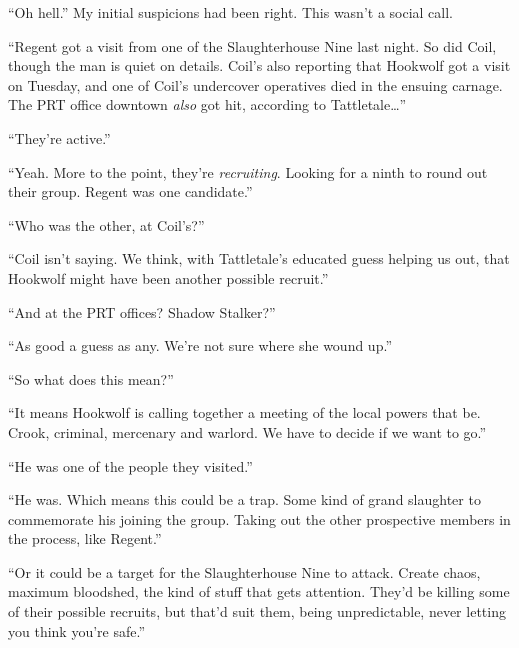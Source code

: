 ``Oh hell.''  My initial suspicions had been right.  This wasn't a social call.



``Regent got a visit from one of the Slaughterhouse Nine last night.  So did Coil, though the man is quiet on details.  Coil's also reporting that Hookwolf got a visit on Tuesday, and one of Coil's undercover operatives died in the ensuing carnage.  The PRT office downtown \emph{also} got hit, according to Tattletale\ldots''



``They're active.''



``Yeah.  More to the point, they're \emph{recruiting}.  Looking for a ninth to round out their group.  Regent was one candidate.''



``Who was the other, at Coil's?''



``Coil isn't saying.  We think, with Tattletale's educated guess helping us out, that Hookwolf might have been another possible recruit.''



``And at the PRT offices?  Shadow Stalker?''



``As good a guess as any.  We're not sure where she wound up.''



``So what does this mean?''



``It means Hookwolf is calling together a meeting of the local powers that be.  Crook, criminal, mercenary and warlord.  We have to decide if we want to go.''



``He was one of the people they visited.''



``He was.  Which means this could be a trap.  Some kind of grand slaughter to commemorate his joining the group.  Taking out the other prospective members in the process, like Regent.''



``Or it could be a target for the Slaughterhouse Nine to attack.  Create chaos, maximum bloodshed, the kind of stuff that gets attention.  They'd be killing some of their possible recruits, but that'd suit them, being unpredictable, never letting you think you're safe.''



